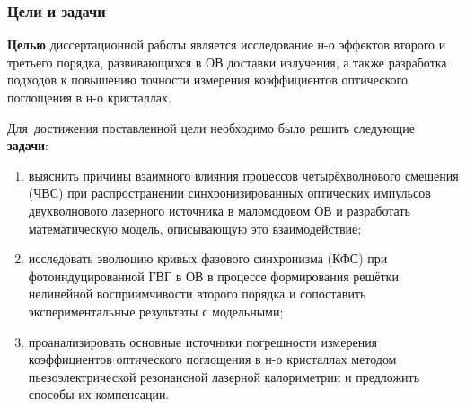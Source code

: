 \begin{frame}[plain]
	\justifying
	\frametitle{Цели и задачи}
	\textbf{Целью} диссертационной работы является исследование н-о эффектов второго и третьего порядка, развивающихся в ОВ доставки излучения, а также разработка подходов к повышению точности измерения коэффициентов оптического поглощения в н-о кристаллах.
	
	Для~достижения поставленной цели необходимо было решить следующие \textbf{задачи}:
	\begin{enumerate} %
		\item выяснить причины взаимного влияния процессов четырёхволнового смешения (ЧВС) при распространении синхронизированных оптических импульсов двухволнового лазерного источника в маломодовом ОВ и разработать математическую модель, описывающую это взаимодействие;
		
		\item исследовать эволюцию кривых фазового синхронизма (КФС) при фотоиндуцированной ГВГ в ОВ в процессе формирования решётки нелинейной восприимчивости второго порядка и сопоставить экспериментальные результаты с модельными;
		
		\item проанализировать основные источники погрешности измерения коэффициентов оптического поглощения в н-о кристаллах методом пьезоэлектрической резонансной лазерной калориметрии и предложить способы их компенсации.
	\end{enumerate}

\end{frame}

%
%
%
%
